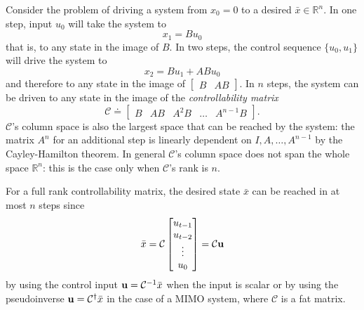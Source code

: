 Consider the problem of driving a system from $x_0=0$ to a desired $\bar{x}\in \mathbb{R}^n$. In one step, input $u_0$ will take the system to
\begin{equation*}
  x_1 = Bu_0
\end{equation*}
that is, to any state in the image of $B$. In two steps, the control sequence $\{u_0,u_1\}$ will drive the system to
\begin{equation*}
  x_2 = Bu_1 + ABu_0
\end{equation*}
and therefore to any state in the image of $\begin{bmatrix}B & AB\end{bmatrix}$. In $n$ steps, the system can be driven to any state in the image of the \emph{controllability matrix}
\begin{equation}
  \label{eq:controllability-matrix}
  \mathcal{C} \doteq
  \begin{bmatrix}
    B & AB & A^2B & \ldots & A^{n-1}B
  \end{bmatrix}.
\end{equation}
$\mathcal{C}$'s column space is also the largest space that can be reached by the system: the matrix $A^n$ for an additional step is linearly dependent on $I,A,\ldots, A^{n-1}$ by the Cayley-Hamilton theorem. In general $\mathcal{C}$'s column space does not span the whole space $\mathbb{R}^n$: this is the case only when $\mathcal{C}$'s rank is $n$.

For a full rank controllability matrix, the desired state $\bar{x}$ can be reached in at most $n$ steps since
\begin{equation*}
  \bar{x} = \mathcal{C}
  \begin{bmatrix}
    u_{t-1} \\ u_{t-2} \\ \vdots \\ u_0
  \end{bmatrix} = \mathcal{C} \boldsymbol{\mathrm{u}}
\end{equation*}
by using the control input $\boldsymbol{\mathrm{u}} = \mathcal{C}^{-1}\bar{x}$ when the input is scalar or by using the pseudoinverse $\boldsymbol{\mathrm{u}} = \mathcal{C}^\dagger\bar{x}$ in the case of a MIMO system, where $\mathcal{C}$ is a fat matrix.

